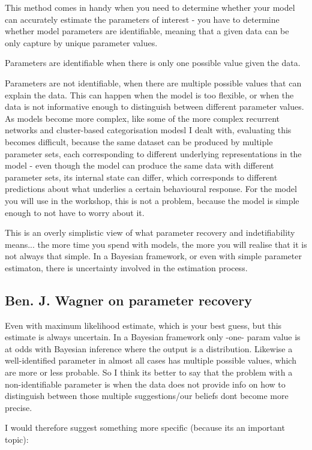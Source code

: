 \documentclass[12pt]{article}
\begin{document}
This method comes in handy when you need to determine whether your model can accurately estimate the parameters of interest - you have to determine whether model parameters are identifiable, meaning that a given data can be only capture by unique parameter values.

Parameters are identifiable when there is only one possible value given the data.

Parameters are not identifiable, when there are multiple possible values that can explain the data. This can happen when the model is too flexible, or when the data is not informative enough to distinguish between different parameter values. As models become more complex, like some of the more complex recurrent networks and cluster-based categorisation modesl I dealt with, evaluating this becomes difficult, because the same dataset can be produced by multiple parameter sets, each corresponding to different underlying representations in the model - even though the model can produce the same data with different parameter sets, its internal state can differ, which corresponds to different predictions about what underlies a certain behavioural response. For the model you will use in the workshop, this is not a problem, because the model is simple enough to not have to worry about it.

This is an overly simplistic view of what parameter recovery and indetifiability means... the more time you spend with models, the more you will realise that it is not always that simple. In a Bayesian framework, or even with simple parameter estimaton, there is uncertainty involved in the estimation process.

\subsection{Ben. J. Wagner on parameter recovery}

 Even with maximum likelihood estimate, which is your best guess, but this estimate is always uncertain.  In a Bayesian framework only -one- param value is at odds with Bayesian inference where the output is a distribution.
Likewise a well-identified parameter in almost all cases has multiple possible values, which are more or less probable.
So I think its better to say that the problem with a non-identifiable parameter is when the data does not provide info on how to distinguish between those multiple suggestions/our beliefs dont become more precise.

I would therefore suggest something more specific (because its an important topic):
\end{document}
